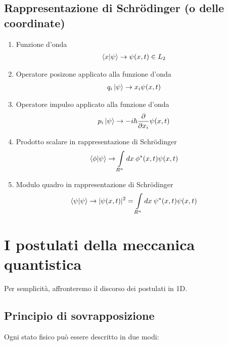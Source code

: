  \subsection{Rappresentazione di Schrödinger (o delle coordinate)}
 
 \begin{enumerate}
 	\item Funzione d'onda
 		 \begin{align}
 			\braket{x | \psi} &\rightarrow \psi(x,t) \in L_2
 		\end{align}
 	\item Operatore posizone applicato alla funzione d'onda
 		 \begin{align}
			q_i\ket{\psi} &\rightarrow x_i\psi(x,t)
 		\end{align}
 	\item Operatore impulso applicato alla funzione d'onda
		 \begin{align}
			p_i\ket{\psi} &\rightarrow -i\hbar \frac{\partial}{\partial x_i}  \psi(x,t)
		\end{align} 	
 	\item Prodotto scalare in rappresentazione di Schrödinger
 		 \begin{align}
	 			\braket{\phi | \psi} &\rightarrow \int \limits_{R^n} dx \: \phi^*(x,t)\psi(x,t) 
 		\end{align}
 	\item Modulo quadro in rappresentazione di Schrödinger
 		 \begin{align}
 			\braket{\psi | \psi} &\rightarrow |\psi(x,t)|^2 = \int \limits_{R^n} dx \: \psi^*(x,t)\psi(x,t)
 		\end{align}
 \end{enumerate}
 
\section{I postulati della meccanica quantistica}

Per semplicità, affronteremo il discorso dei postulati in 1D. 

\subsection{Principio di sovrapposizione}
	Ogni stato fisico può essere descritto in due modi:
	
